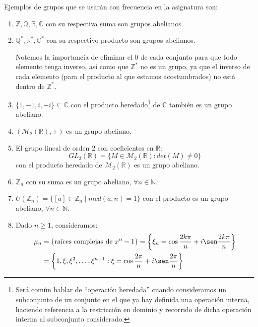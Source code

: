 \begin{ejemplo} Ejemplos de grupos que se usarán con frecuencia en la asignatura son:
     \begin{enumerate}
         \item $\mathbb{Z},\mathbb{Q},\mathbb{R},\mathbb{C}$ con su respectiva suma son grupos abelianos.
         \item $\mathbb{Q}^\ast,\mathbb{R}^\ast,\mathbb{C}^\ast$ con su respectivo producto son grupos abelianos.

             Notemos la importancia de eliminar el $0$ de cada conjunto para que todo elemento tenga inverso, así como que $\mathbb{Z}^\ast$ no es un grupo, ya que el inverso de cada elemento (para el producto al que estamos acostumbrados) no está dentro de $\mathbb{Z}^\ast$.
         \item $\{1,-1,i,-i\}\subseteq \mathbb{C}$ con el producto heredado\footnote{Será común hablar de ``operación heredada'' cuando consideramos un subconjunto de un conjunto en el que ya hay definida una operación interna, haciendo referencia a la restricción en dominio y recorrido de dicha operación interna al subconjunto considerado.} de $\mathbb{C}$ también es un grupo abeliano.
         \item $(\mathcal{M}_2(\mathbb{R}),+)$ es un grupo abeliano.
         \item El grupo lineal de orden 2 con coeficientes en $\mathbb{R}$:
             \begin{equation*}
                 GL_2(\mathbb{R}) = \{M\in \mathcal{M}_2(\mathbb{R}) : det(M)\neq 0\}
             \end{equation*}
             con el producto heredado de $\mathcal{M}_2(\mathbb{R})$ es un grupo abeliano.
         \item $\mathbb{Z}_n$ con su suma es un grupo abeliano, $\forall n\in \mathbb{N}$.
         \item $U(\mathbb{Z}_n)=\{[a]\in \mathbb{Z}_n \mid mcd(a,n)=1\}$ con el producto es un grupo abeliano, $\forall n\in \mathbb{N}$.
         \item Dado $n\geq 1$, consideramos:
             \begin{align*}
                 \mu_n &= \{\text{raíces complejas de\ } x^n-1\} = \left\{\xi_n = \cos\frac{2k\pi}{n} + i\sen\frac{2k\pi}{n}\right\} \\
                       &= \left\{1,\xi,\xi^2, \ldots, \xi^{n-1} : \xi = \cos\frac{2\pi}{n} + i\sen\frac{2\pi}{n}\right\}
             \end{align*}

\end{enumerate}
\end{ejemplo}

